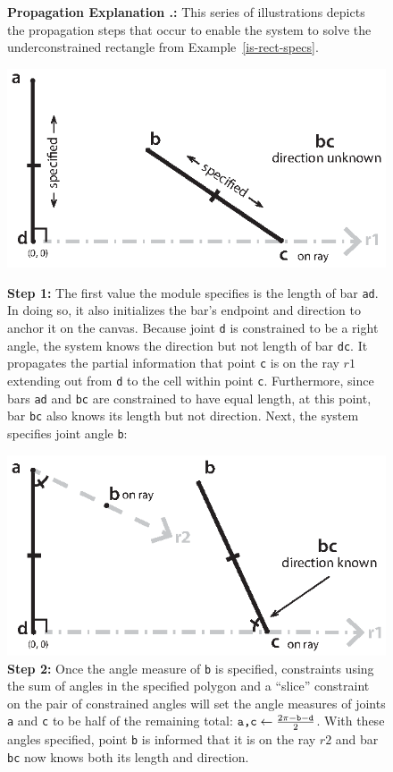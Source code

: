 \label{illustration}
\begin{figure}[h]
\captionsetup{labelformat=empty}
\caption{{\bf Propagation Explanation
    .:} This series of
  illustrations depicts the propagation steps that occur to enable the
  system to solve the underconstrained rectangle from
  Example~\ref{is-rect-specs}.
}
\centering
\includegraphics[width=.95\textwidth]{diagrams/is-rect-explained-boards-1.eps}
\caption{{\bf Step 1:} The first value the module specifies is the
  length of bar \texttt{ad}. In doing so, it also initializes the
  bar's endpoint and direction to anchor it on the canvas. Because
  joint \texttt{d} is constrained to be a right angle, the system knows
  the direction but not length of bar \texttt{dc}. It propagates the
  partial information that point \texttt{c} is on the ray $r1$ extending
  out from \texttt{d} to the cell within point
  \texttt{c}. Furthermore, since bars \texttt{ad} and \texttt{bc} are
  constrained to have equal length, at this point, bar \texttt{bc} also knows
  its length but not direction. Next, the system specifies joint angle \texttt{b}:}
\includegraphics[width=.95\textwidth]{diagrams/is-rect-explained-boards-2.eps}
\caption{{\bf Step 2:} Once the angle measure of \texttt{b} is
  specified, constraints using the sum of angles in the specified
  polygon and a ``slice'' constraint on the pair of constrained angles
  will set the angle measures of joints \texttt{a} and \texttt{c} to
  be half of the remaining total:
  $\text{\texttt{a,c}}\protect\leftarrow\frac{2\protect\pi -
    \text{\texttt{b}} - \text{\texttt{d}}}{2}$. With these angles
  specified, point \texttt{b} is informed that it is on the ray $r2$
  and bar \texttt{bc} now knows both its length and direction.}
\vspace{-10em}
\end{figure}

